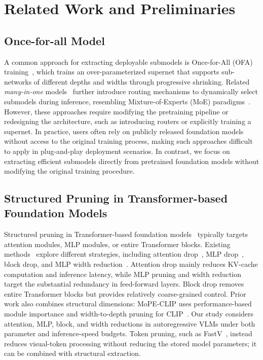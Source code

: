 \documentclass[11pt]{article}
\begin{document}
\section{Related Work and Preliminaries}

\subsection{Once-for-all Model}

A common approach for extracting deployable submodels is Once-for-All (OFA) training~\cite{cai2019once,sakuma2023detofa}, which trains an over-parameterized supernet that supports sub-networks of different depths and widths through progressive shrinking. Related \emph{many-in-one} models~\cite{cai2024flextron,cai2025llamaflex} further introduce routing mechanisms to dynamically select submodels during inference, resembling Mixture-of-Experts (MoE) paradigms~\cite{mu2025comprehensive,zhou2022mixture}. However, these approaches require modifying the pretraining pipeline or redesigning the architecture, such as introducing routers or explicitly training a supernet. In practice, users often rely on publicly released foundation models without access to the original training process, making such approaches difficult to apply in plug-and-play deployment scenarios. In contrast, we focus on extracting efficient submodels directly from pretrained foundation models without modifying the original training procedure.

\subsection{Structured Pruning in Transformer-based Foundation Models}

Structured pruning in Transformer-based foundation models~\cite{vaswani2017attention} typically targets attention modules, MLP modules, or entire Transformer blocks. Existing methods~\cite{ma2023llm,he2024rethinking} explore different strategies, including attention drop~\cite{he2024matters}, MLP drop~\cite{mugnaini2025efficient}, block drop, and MLP width reduction~\cite{lei2025making,he2025understanding}. Attention drop mainly reduces KV-cache computation and inference latency, while MLP pruning and width reduction target the substantial redundancy in feed-forward layers. Block drop removes entire Transformer blocks but provides relatively coarse-grained control. Prior work also combines structural dimensions: MoPE-CLIP uses performance-based module importance and width-to-depth pruning for CLIP~\cite{lin2024mope}. Our study considers attention, MLP, block, and width reductions in autoregressive VLMs under both parameter and inference-speed budgets. Token pruning, such as FastV~\cite{chen2024fastv}, instead reduces visual-token processing without reducing the stored model parameters; it can be combined with structural extraction.
\end{document}
